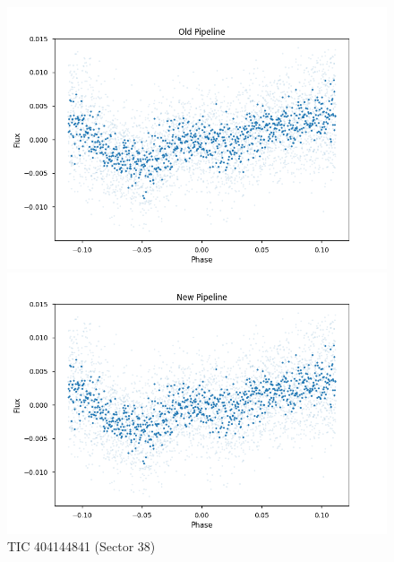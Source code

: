 \documentclass{article}
\begin{document}
\begin{figure}[h!]
    \centering
    \begin{minipage}{0.45\textwidth}
        \centering
        \includegraphics[width=\textwidth]{./figures/8_old.png}
    \end{minipage}%
    \hfill
    \begin{minipage}{0.45\textwidth}
        \centering
        \includegraphics[width=\textwidth]{./figures/8_new.png}
    \end{minipage}
    \caption{TIC 404144841 (Sector 38)}
\end{figure}
\end{document}

